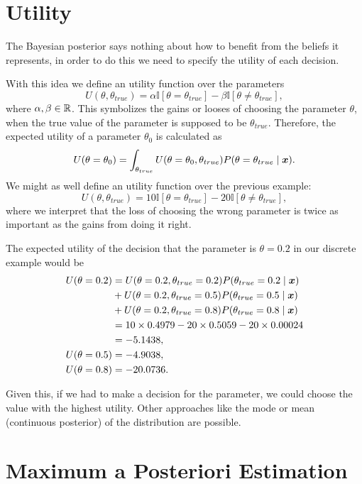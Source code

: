 \section{Utility}
The Bayesian posterior says nothing about how to benefit from the beliefs it
represents, in order to do this we need to specify the utility of each decision.

With this idea we define an utility function over the parameters
\[
  U(\theta, \theta_{true}) = \alpha \mathbb{I}[\theta = \theta_{true}] - \beta
  \mathbb{I}[\theta \neq \theta_{true}],
\]
where \(\alpha, \beta \in \mathbb{R}\). This symbolizes the gains or looses of choosing
the parameter \(\theta\), when the true value of the parameter is supposed to be
\(\theta_{true}\). Therefore, the expected utility of a parameter \(\theta_0\) is
calculated as
\[
  U(\theta = \theta_0) = \int_{\theta_{true}}U(\theta = \theta_0,
  \theta_{true})P(\theta = \theta_{true}  \mid  \bm{x}).
\]
We might as well define an utility function over the previous example:
\[
  U(\theta, \theta_{true}) = 10\mathbb{I}[\theta = \theta_{true}] - 20
  \mathbb{I}[\theta \neq \theta_{true}],
\]
where we interpret that the loss of choosing the wrong parameter is twice as
important as the gains from doing it right.

The expected utility of the decision that the parameter is \(\theta = 0.2\)
in our discrete example would be
\[
  \begin{aligned}
  U(\theta = 0.2) &= U(\theta = 0.2, \theta_{true} = 0.2)P(\theta_{true} = 0.2  \mid
  \bm{x})\\
  &+ U(\theta = 0.2, \theta_{true} = 0.5)P(\theta_{true} = 0.5  \mid
  \bm{x}) \\
  & +  U(\theta = 0.2, \theta_{true} = 0.8)P(\theta_{true} = 0.8  \mid  \bm{x})\\
  &= 10 \times 0.4979 - 20\times 0.5059 -20 \times 0.00024 \\
  &= -5.1438,\\
  U(\theta = 0.5) &= -4.9038, \\
  U(\theta = 0.8) &= -20.0736.
\end{aligned}
\]

Given this, if we had to make a decision for the parameter, we could choose the value with the highest utility. Other approaches like the mode or mean (continuous posterior) of the distribution are possible.

\section{Maximum a Posteriori Estimation}

